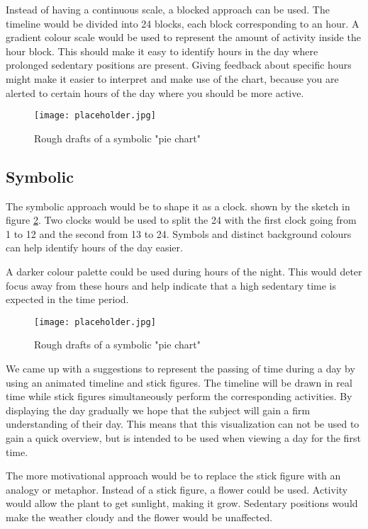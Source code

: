 Instead of having a continuous scale, a blocked approach can be used. The timeline would be divided into 24 blocks, each block corresponding to an hour. A gradient colour scale would be used to represent the amount of activity inside the hour block. This should make it easy to identify hours in the day where prolonged sedentary positions are present. Giving feedback about specific hours might make it easier to interpret and make use of the chart, because you are alerted to certain hours of the day where you should be more active.

\begin{figure}[h!]
	\centering
		\texttt{[image: placeholder.jpg]}
		\caption{\footnotesize Rough drafts of a symbolic "pie chart"}
		\label{fig:simpleTimeline}
\end{figure}

\subsection{Symbolic}
The symbolic approach would be to shape it as a clock. shown by the sketch in figure \ref{fig:clock}. Two clocks would be used to split the 24 with the first clock going from 1 to 12 and the second from 13 to 24. Symbols and distinct background colours can help identify hours of the day easier. 

A darker colour palette could be used during hours of the night. This would deter focus away from these hours and help indicate that a high sedentary time is expected in the time period. 

\begin{figure}[h!]
	\centering
		\texttt{[image: placeholder.jpg]}
		\caption{\footnotesize Rough drafts of a symbolic "pie chart"}
		\label{fig:clock}
\end{figure}
We came up with a suggestions to represent the passing of time during a day by using an animated timeline and stick figures. The timeline will be drawn in real time while stick figures simultaneously perform the corresponding activities. By displaying the day gradually we hope that the subject will gain a firm understanding of their day. This means that this visualization can not be used to gain a quick overview, but is intended to be used when viewing a day for the first time.

The more motivational approach would be to replace the stick figure with an analogy or metaphor. Instead of a stick figure, a flower could be used. Activity would allow the plant to get sunlight, making it grow. Sedentary positions would make the weather cloudy and the flower would be unaffected.

